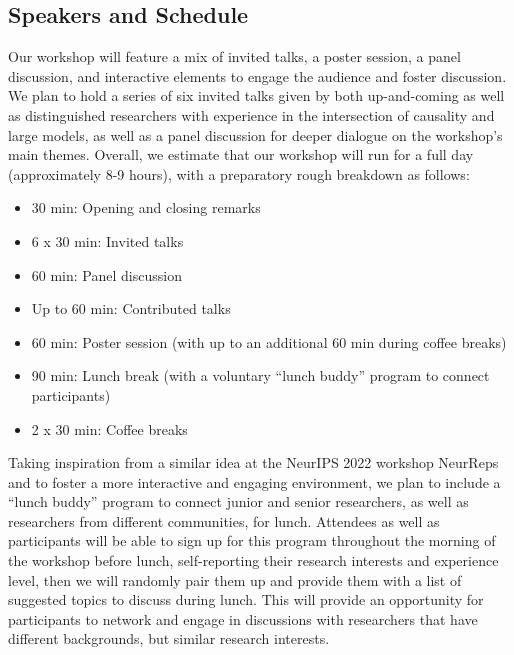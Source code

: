 \documentclass{article}
\begin{document}


\subsection{Speakers and Schedule}

Our workshop will feature a mix of invited talks, a poster session, a panel discussion, and interactive elements to engage the audience and foster discussion. 
We plan to hold a series of six invited talks given by both up-and-coming as well as distinguished researchers with experience in the intersection of causality and large models, as well as a panel discussion for deeper dialogue on the workshop's main themes. Overall, we estimate that our workshop will run for a full day (approximately 8-9 hours), with a preparatory rough breakdown as follows:


\begin{itemize}[nolistsep]
    \item 30 min: Opening and closing remarks
    \item 6 x 30 min: Invited talks
    \item 60 min: Panel discussion
    \item Up to 60 min: Contributed talks
    \item 60 min: Poster session (with up to an additional 60 min during coffee breaks)
    \item 90 min: Lunch break (with a voluntary ``lunch buddy'' program to connect participants)
    \item 2 x 30 min: Coffee breaks
\end{itemize}





Taking inspiration from a similar idea at the NeurIPS 2022 workshop NeurReps and to foster a more interactive and engaging environment, we plan to include a ``lunch buddy'' program to connect junior and senior researchers, as well as researchers from different communities, for lunch. 
Attendees as well as participants will be able to sign up for this program throughout the morning of the workshop before lunch, self-reporting their research interests and experience level, then we will randomly pair them up and provide them with a list of suggested topics to discuss during lunch.
This will provide an opportunity for participants to network and engage in discussions with researchers that have different backgrounds, but similar research interests.
\end{document}
